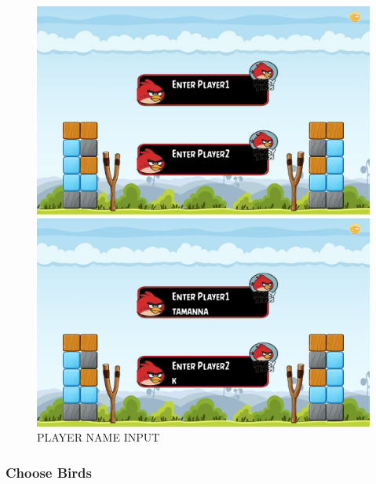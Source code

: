\documentclass{article}
\begin{document}
\begin{figure}[h]
    \begin{minipage}[b]{0.45\linewidth}
        \centering
        \includegraphics[width = 1\textwidth,left]{enter_players.png}
    \end{minipage}
    \hspace{0.25\textwidth}
    \begin{minipage}[b]{0.45\linewidth}
        \centering
        \includegraphics[width = 1\textwidth,left]{entering_players.png}
    \end{minipage}
    \caption{PLAYER NAME INPUT}
    \label{fig:PLAYER_NAME_INPUT}
\end{figure}

\newpage
\subsubsection{Choose Birds}
\end{document}
